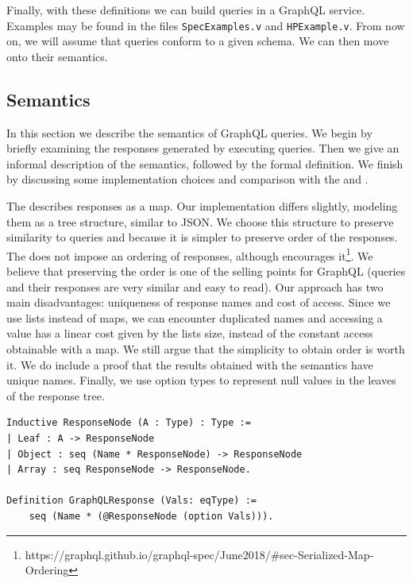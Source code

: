 

Finally, with these definitions we can build queries in a GraphQL service. Examples may be found in the files \texttt{SpecExamples.v} and \texttt{HPExample.v}. From now on, we will assume that queries conform to a given schema. We can then move onto their semantics.

\subsection{Semantics}\label{subsec:semantics}

In this section we describe the semantics of GraphQL queries. We begin by briefly examining the responses generated by executing queries. Then we give an informal description of the semantics, followed by the formal definition. We finish by discussing some implementation choices and comparison with the \spec{} and \HP{}.

The \spec{} describes responses as a map. Our implementation differs slightly, modeling them as a tree structure, similar to JSON. We choose this structure to preserve similarity to queries and because it is simpler to preserve order of the responses. The \spec{} does not impose an ordering of responses, although encourages it\footnote{https://graphql.github.io/graphql-spec/June2018/\#sec-Serialized-Map-Ordering}. We believe that preserving the order is one of the selling points for GraphQL (queries and their responses are very similar and easy to read). Our approach has two main disadvantages: uniqueness of response names and cost of access. Since we use lists instead of maps, we can encounter duplicated names and accessing a value has a linear cost given by the lists size, instead of the constant access obtainable with a map. We still argue that the simplicity to obtain order is worth it. We do include a proof that the results obtained with the semantics have unique names. Finally, we use option types to represent null values in the leaves of the response tree.

\begin{verbatim}
Inductive ResponseNode (A : Type) : Type :=
| Leaf : A -> ResponseNode
| Object : seq (Name * ResponseNode) -> ResponseNode
| Array : seq ResponseNode -> ResponseNode.

Definition GraphQLResponse (Vals: eqType) :=
    seq (Name * (@ResponseNode (option Vals))).
\end{verbatim}


